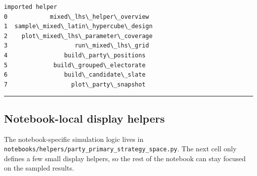 \documentclass[11pt]{article}
\makeatletter
\newcommand{\boxspacing}{\kern\kvtcb@left@rule\kern\kvtcb@boxsep}
\newcommand{\prompt}[4]{
        {\ttfamily\llap{{\color{#2}[#3]:\hspace{3pt}#4}}\vspace{-\baselineskip}}
    }
\makeatother
\begin{document}
            \begin{tcolorbox}[breakable, size=fbox, boxrule=.5pt, pad at break*=1mm, opacityfill=0]
\prompt{Out}{outcolor}{22}{\boxspacing}
\begin{Verbatim}[commandchars=\\\{\}]
                       imported helper
0            mixed\_lhs\_helper\_overview
1  sample\_mixed\_latin\_hypercube\_design
2    plot\_mixed\_lhs\_parameter\_coverage
3                   run\_mixed\_lhs\_grid
4                build\_party\_positions
5             build\_grouped\_electorate
6                build\_candidate\_slate
7                  plot\_party\_snapshot
\end{Verbatim}
\end{tcolorbox}
        
    \begin{center}\rule{0.5\linewidth}{0.5pt}\end{center}

\subsection{Notebook-local display
helpers}\label{notebook-local-display-helpers}

The notebook-specific simulation logic lives in
\texttt{notebooks/helpers/party\_primary\_strategy\_space.py}. The next
cell only defines a few small display helpers, so the rest of the
notebook can stay focused on the sampled results.
\end{document}
